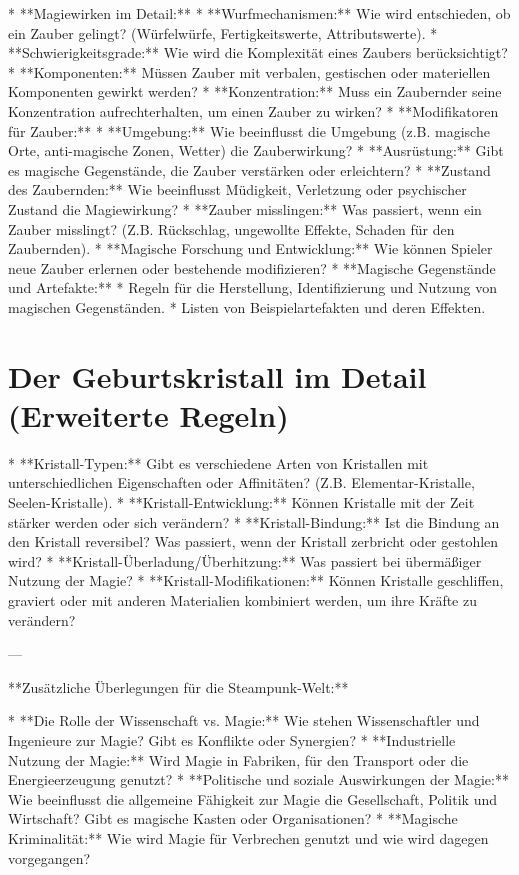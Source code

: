 \documentclass[10pt,a4paper,twocolumn,openany]{book}
\begin{document}
* **Magiewirken im Detail:**
* **Wurfmechanismen:** Wie wird entschieden, ob ein Zauber gelingt? (Würfelwürfe, Fertigkeitswerte, Attributswerte).
* **Schwierigkeitsgrade:** Wie wird die Komplexität eines Zaubers berücksichtigt?
* **Komponenten:** Müssen Zauber mit verbalen, gestischen oder materiellen Komponenten gewirkt werden?
* **Konzentration:** Muss ein Zaubernder seine Konzentration aufrechterhalten, um einen Zauber zu wirken?
* **Modifikatoren für Zauber:**
* **Umgebung:** Wie beeinflusst die Umgebung (z.B. magische Orte, anti-magische Zonen, Wetter) die Zauberwirkung?
* **Ausrüstung:** Gibt es magische Gegenstände, die Zauber verstärken oder erleichtern?
* **Zustand des Zaubernden:** Wie beeinflusst Müdigkeit, Verletzung oder psychischer Zustand die Magiewirkung?
* **Zauber misslingen:** Was passiert, wenn ein Zauber misslingt? (Z.B. Rückschlag, ungewollte Effekte, Schaden für den Zaubernden).
* **Magische Forschung und Entwicklung:** Wie können Spieler neue Zauber erlernen oder bestehende modifizieren?
* **Magische Gegenstände und Artefakte:**
* Regeln für die Herstellung, Identifizierung und Nutzung von magischen Gegenständen.
* Listen von Beispielartefakten und deren Effekten.

\chapter{Der Geburtskristall im Detail (Erweiterte Regeln)}

* **Kristall-Typen:** Gibt es verschiedene Arten von Kristallen mit unterschiedlichen Eigenschaften oder Affinitäten? (Z.B. Elementar-Kristalle, Seelen-Kristalle).
* **Kristall-Entwicklung:** Können Kristalle mit der Zeit stärker werden oder sich verändern?
* **Kristall-Bindung:** Ist die Bindung an den Kristall reversibel? Was passiert, wenn der Kristall zerbricht oder gestohlen wird?
* **Kristall-Überladung/Überhitzung:** Was passiert bei übermäßiger Nutzung der Magie?
* **Kristall-Modifikationen:** Können Kristalle geschliffen, graviert oder mit anderen Materialien kombiniert werden, um ihre Kräfte zu verändern?

---

**Zusätzliche Überlegungen für die Steampunk-Welt:**

* **Die Rolle der Wissenschaft vs. Magie:** Wie stehen Wissenschaftler und Ingenieure zur Magie? Gibt es Konflikte oder Synergien?
* **Industrielle Nutzung der Magie:** Wird Magie in Fabriken, für den Transport oder die Energieerzeugung genutzt?
* **Politische und soziale Auswirkungen der Magie:** Wie beeinflusst die allgemeine Fähigkeit zur Magie die Gesellschaft, Politik und Wirtschaft? Gibt es magische Kasten oder Organisationen?
* **Magische Kriminalität:** Wie wird Magie für Verbrechen genutzt und wie wird dagegen vorgegangen?
\end{document}
